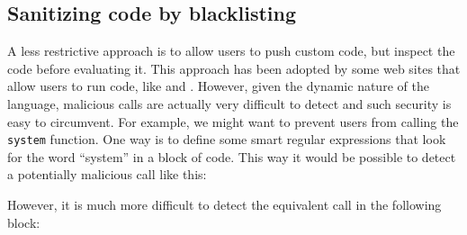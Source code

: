 \begin{knitrout}\mycodesize
{}\color{fgcolor}\begin{kframe}
\begin{alltt}
 \hlkwb{<-} \hlstd{(}\hlstd{,} 
\end{alltt}
\end{kframe}
\end{knitrout}


\subsection{Sanitizing code by blacklisting}

A less restrictive approach is to allow users to push custom \R code, but
inspect the code before evaluating it. This approach has been adopted by some
web sites that allow users to run \R code, like \cite{banfield1999rweb} and
\cite{cloudstat}. However, given the dynamic nature of the \R language,
malicious calls are actually very difficult to detect and such security is easy
to circumvent. For example, we might want to prevent users from calling the
\texttt{system} function. One way is to define some smart regular expressions
that look for the word ``system'' in a block of code. This way it would be
possible to detect a potentially malicious call like this:

\begin{knitrout}\mycodesize
{}\color{fgcolor}\begin{kframe}
\begin{alltt}
\hlstd{(}\hlstd{)}
\end{alltt}
\end{kframe}
\end{knitrout}


However, it is much more difficult to detect the equivalent call in the following
block:

\begin{knitrout}\mycodesize
{}\color{fgcolor}\begin{kframe}
\begin{alltt}
 \hlkwb{<-} \hlstd{(}\hlstd{(}\hlstd{,} \hlstd{,}  \hlstd{=} \hlstd{))}
 \hlkwb{<-} \hlstd{(}\hlstd{,} \hlstd{,}  \hlstd{=} \hlstd{)}
\end{alltt}
\end{kframe}
\end{knitrout}


